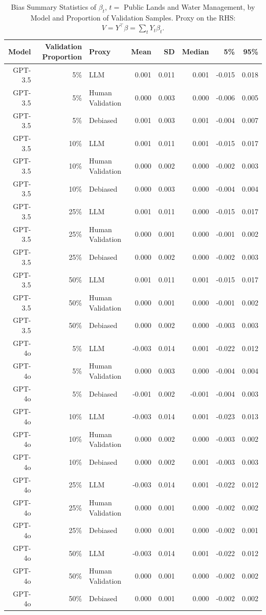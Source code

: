 \begin{table}

\caption{\label{tab:unnamed-chunk-1}Bias Summary Statistics of $\beta_{t}$, $t=$ Public Lands and Water Management, by Model and Proportion of Validation Samples.
      Proxy on the RHS: $V = Y^\top \beta = \sum_{t} Y_t \beta_t$.}
\centering
\begin{tabular}[t]{rrlrrrrr}
\toprule
Model & Validation Proportion & Proxy & Mean & SD & Median & 5\% & 95\%\\
\midrule
GPT-3.5 & 5\% & LLM & 0.001 & 0.011 & 0.001 & -0.015 & 0.018\\
GPT-3.5 & 5\% & Human Validation & 0.000 & 0.003 & 0.000 & -0.006 & 0.005\\
GPT-3.5 & 5\% & Debiased & 0.001 & 0.003 & 0.001 & -0.004 & 0.007\\
GPT-3.5 & 10\% & LLM & 0.001 & 0.011 & 0.001 & -0.015 & 0.017\\
GPT-3.5 & 10\% & Human Validation & 0.000 & 0.002 & 0.000 & -0.002 & 0.003\\
GPT-3.5 & 10\% & Debiased & 0.000 & 0.003 & 0.000 & -0.004 & 0.004\\
GPT-3.5 & 25\% & LLM & 0.001 & 0.011 & 0.000 & -0.015 & 0.017\\
GPT-3.5 & 25\% & Human Validation & 0.000 & 0.001 & 0.000 & -0.001 & 0.002\\
GPT-3.5 & 25\% & Debiased & 0.000 & 0.002 & 0.000 & -0.002 & 0.003\\
GPT-3.5 & 50\% & LLM & 0.001 & 0.011 & 0.001 & -0.015 & 0.017\\
GPT-3.5 & 50\% & Human Validation & 0.000 & 0.001 & 0.000 & -0.001 & 0.002\\
GPT-3.5 & 50\% & Debiased & 0.000 & 0.002 & 0.000 & -0.003 & 0.003\\
GPT-4o & 5\% & LLM & -0.003 & 0.014 & 0.001 & -0.022 & 0.012\\
GPT-4o & 5\% & Human Validation & 0.000 & 0.003 & 0.000 & -0.004 & 0.004\\
GPT-4o & 5\% & Debiased & -0.001 & 0.002 & -0.001 & -0.004 & 0.003\\
GPT-4o & 10\% & LLM & -0.003 & 0.014 & 0.001 & -0.023 & 0.013\\
GPT-4o & 10\% & Human Validation & 0.000 & 0.002 & 0.000 & -0.003 & 0.002\\
GPT-4o & 10\% & Debiased & 0.000 & 0.002 & 0.001 & -0.003 & 0.003\\
GPT-4o & 25\% & LLM & -0.003 & 0.014 & 0.001 & -0.022 & 0.012\\
GPT-4o & 25\% & Human Validation & 0.000 & 0.001 & 0.000 & -0.002 & 0.002\\
GPT-4o & 25\% & Debiased & 0.000 & 0.001 & 0.000 & -0.002 & 0.001\\
GPT-4o & 50\% & LLM & -0.003 & 0.014 & 0.001 & -0.022 & 0.012\\
GPT-4o & 50\% & Human Validation & 0.000 & 0.001 & 0.000 & -0.002 & 0.002\\
GPT-4o & 50\% & Debiased & 0.000 & 0.001 & 0.000 & -0.002 & 0.002\\
\bottomrule
\end{tabular}
\end{table}
